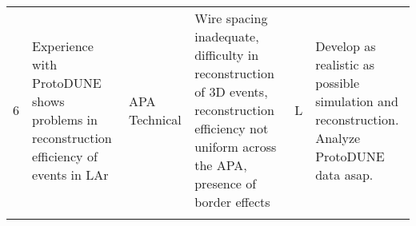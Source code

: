 \begin{longtable}{p{}p{}p{}p{}p{}p{}}
6 & Experience with ProtoDUNE shows problems in reconstruction efficiency of events in LAr & APA Technical & Wire spacing inadequate, difficulty in reconstruction of 3D events, reconstruction efficiency not uniform across the APA, presence of border effects & L & Develop as realistic as possible simulation and reconstruction. Analyze ProtoDUNE data asap.  \\  \colhline

\label{tab:risks:SP-FD-APA}
\end{longtable}